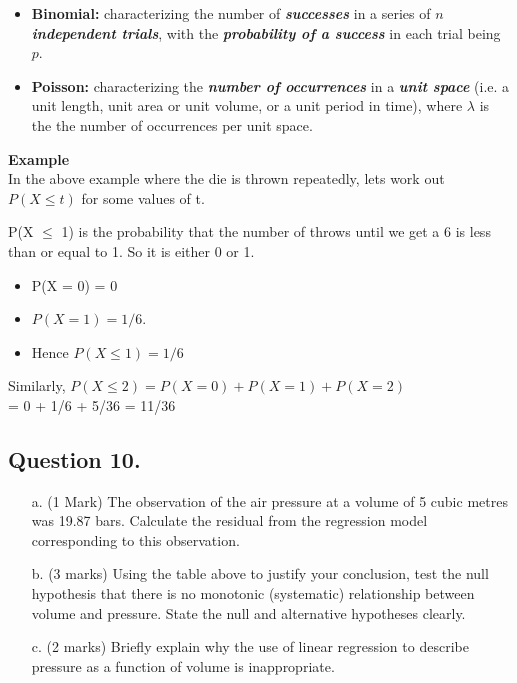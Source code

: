 \documentclass[]{report}
\begin{document}
{{\begin{itemize}
\item \textbf{Binomial:} characterizing the number of \textbf{\emph{successes}} in a series of \textbf{\emph{$n$ independent trials}}, with the \textbf{\emph{probability of a success}} in each trial being $p$.

\item \textbf{Poisson:}  characterizing the \textbf{\emph{number of occurrences}} in a \textbf{\emph{unit space}} (i.e. a unit length, unit area or unit volume, or a unit period in time), where $\lambda$ is the the number of occurrences per unit space.

\end{itemize}
}



\textbf{Example}\\

In the above example where the die is thrown repeatedly, lets work out $P(X \leq t)$ for some values of t.

P(X $\leq$ 1) is the probability that the number of throws until we get a 6 is less than or equal to 1. So it is either 0 or 1. 

\begin{itemize}
\item P(X = 0) = 0 
\item $P(X = 1) = 1/6$.
\item  Hence $P(X \leq 1) = 1/6$
\end{itemize}

Similarly, $P(X \leq 2) = P(X = 0) + P(X = 1) + P(X = 2)$\\ = 0 + 1/6 + 5/36 = 11/36




\subsection*{Question 10. } %

\begin{itemize}
\item[a.] (1 Mark) The observation of the air pressure at a volume of 5 cubic metres was 19.87 bars.
Calculate the residual from the regression model corresponding to this observation.
\item[b.] (3 marks) Using the table above to justify your conclusion, test the null hypothesis that there
is no monotonic (systematic) relationship between volume and pressure. State the null
and alternative hypotheses clearly.
\item[c.] (2 marks) Briefly explain why the use of linear regression to describe pressure as a function
of volume is inappropriate.
\end{itemize}




}
\end{document}
